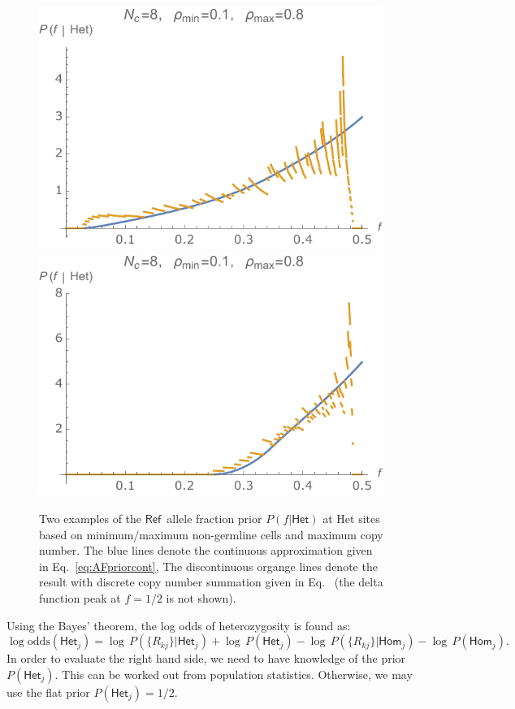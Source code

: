 \documentclass[nofootinbib,amssymb,amsmath]{revtex4}
\newcommand{\REF}{$\mathsf{Ref}$}
\begin{document}
\begin{figure}
\center
\includegraphics[scale=0.7]{figs/AlleleFractionPrior1.pdf}
\includegraphics[scale=0.7]{figs/AlleleFractionPrior2.pdf}
\caption{Two examples of the \REF~allele fraction prior $P(f|\mathsf{Het})$ at Het sites based on minimum/maximum non-germline cells and maximum copy number. The blue lines denote the continuous approximation given in Eq.~\eqref{eq:AFpriorcont}, The discontinuous organge lines denote the result with discrete copy number summation given in Eq.~ (the delta function peak at $f=1/2$ is not shown).}
\label{fig:AFprior}
\end{figure}

 Using the Bayes' theorem, the log odds of heterozygosity is found as:
\begin{equation}
\log \mathrm{odds}(\mathsf{Het}_j) = \log\,P(\{R_{kj}\}|\mathsf{Het}_j) + \log\,P(\mathsf{Het}_j) - \log\,P(\{R_{kj}\}|\mathsf{Hom}_j) - \log\,P(\mathsf{Hom}_j).
\end{equation}
In order to evaluate the right hand side, we need to have knowledge of the prior $P(\mathsf{Het}_j)$. This can be worked out from population statistics. Otherwise, we may use the flat prior $P(\mathsf{Het}_j) = 1/2$.\\
\end{document}
